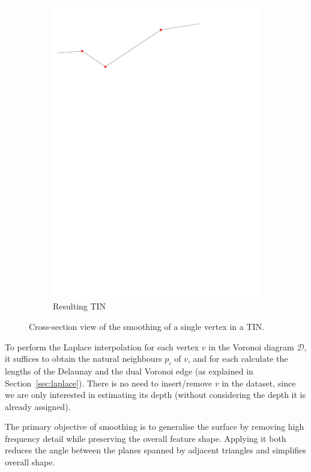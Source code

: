 \begin{figure}[tbh]
\begin{subfigure}[b]{0.45\linewidth}
    \includegraphics[width=\textwidth,page=4]{figs/1Dsmoothop.pdf}
    \caption{Resulting TIN}\label{fig:1Dsmoothop:d}
  \end{subfigure}
  \caption{Cross-section view of the smoothing of a single vertex in a TIN.}
\label{fig:1Dsmoothop}
\end{figure}

To perform the Laplace interpolation for each vertex $v$ in the Voronoi diagram $\mathcal{D}$, it suffices to obtain the natural neighbours $p_i$ of $v$, and for each calculate the lengths of the Delaunay and the dual Voronoi edge (as explained in Section~\ref{sec:laplace}).
There is no need to insert/remove $v$ in the dataset, since we are only interested in estimating its depth (without considering the depth it is already assigned).

The primary objective of smoothing is to generalise the surface by removing high frequency detail while preserving the overall feature shape. 
Applying it both reduces the angle between the planes spanned by adjacent triangles and simplifies overall shape.


